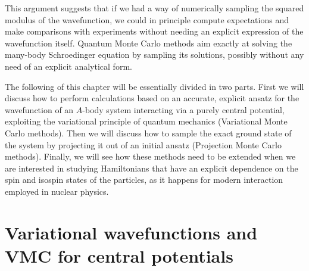 This argument suggests that if we had a way of numerically sampling the squared modulus of the wavefunction, we could in principle compute expectations and make comparisons with experiments
without needing an explicit expression of the wavefunction itself. Quantum Monte Carlo methods
aim exactly at solving the many-body Schroedinger equation by sampling its solutions, possibly
without any need of an explicit analytical form.

The following of this chapter will be essentially divided in two parts. First we will discuss
how to perform calculations based on an accurate, explicit ansatz for the wavefunction of an $A$-body system interacting via a purely central potential, exploiting the variational principle of quantum mechanics (Variational Monte Carlo methods). Then we will discuss how to sample the exact ground state of the system by
projecting it out of an initial ansatz (Projection Monte Carlo methods). Finally, we will
see how these methods need to be extended when we are interested in studying Hamiltonians
that have an explicit dependence on the spin and isospin states of the particles, as it 
happens for modern interaction employed in nuclear physics.

\section{Variational wavefunctions and VMC for central potentials}



